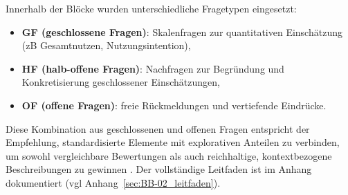 Innerhalb der Blöcke wurden unterschiedliche Fragetypen eingesetzt:
\begin{itemize}
  \item \textbf{GF (geschlossene Fragen)}: Skalenfragen zur quantitativen Einschätzung (\acrshort{zB} Gesamtnutzen, Nutzungsintention),
  \item \textbf{HF (halb-offene Fragen)}: Nachfragen zur Begründung und Konkretisierung geschlossener Einschätzungen,
  \item \textbf{OF (offene Fragen)}: freie Rückmeldungen und vertiefende Eindrücke.
\end{itemize}
Diese Kombination aus geschlossenen und offenen Fragen entspricht der Empfehlung, standardisierte Elemente mit explorativen Anteilen zu verbinden, um sowohl vergleichbare Bewertungen als auch reichhaltige, kontextbezogene Beschreibungen zu gewinnen \cite{420:GlaeserLaudel2010,405:KvaleBrinkmann2015}. Der vollständige Leitfaden ist im Anhang dokumentiert (\acrshort{vgl} Anhang~\ref{sec:BB-02_leitfaden}).
